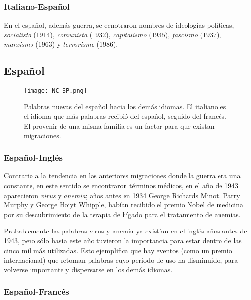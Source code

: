 \subsubsection*{Italiano-Español}%

En el español, además guerra, se ecnotraron nombres de ideologías políticas,  \textit{socialista} (1914), \textit{comunista} (1932), \textit{capitalismo} (1935), \textit{fascismo} (1937),  \textit{marxismo} (1963) y \textit{terrorismo} (1986). 



\subsection{Español}%

\begin{figure} %
	\centering
	\texttt{[image: NC\_SP.png]}
	\label{fig.NC_SP}
	\caption{Palabras nuevas del español hacia los demás idiomas. El italiano es el idioma  que más palabras recibió del español, seguido del francés. El provenir de una misma familia es un factor para que existan migraciones.}
\end{figure} %

\subsubsection*{Español-Inglés}%

Contrario a la tendencia en las anteriores migraciones donde la guerra era una constante, en este sentido se encontraron términos médicos,  en el año de 1943  aparecieron  \textit{virus} y \textit{anemia}; años antes en 1934 George Richards Minot, Parry Murphy y George Hoiyt Whipple, habían recibido el premio Nobel de medicina por su descubrimiento de la terapia de hígado para el tratamiento de anemias.   

Probablemente las palabras virus y anemia ya existían en el inglés años antes de 1943,  pero sólo hasta este año tuvieron la importancia para estar dentro de las cinco mil más utilizadas. Esto ejemplifica que hay eventos (como un premio internacional) que retoman palabras cuyo periodo de uso  ha disminuido,  para volverse importante y dispersarse en los demás idiomas.


\subsubsection*{Español-Francés}%

